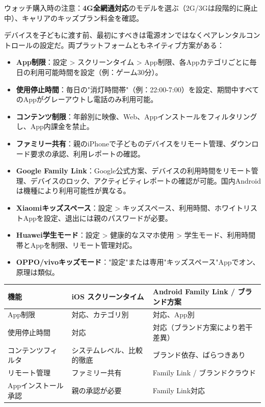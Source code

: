 ウォッチ購入時の注意：\textbf{4G全網通対応}のモデルを選ぶ（2G/3Gは段階的に廃止中）、キャリアのキッズプラン料金を確認。


デバイスを子どもに渡す前、最初にすべきは電源オンではなくペアレンタルコントロールの設定だ。両プラットフォームともネイティブ方案がある：


\begin{itemize}
  \item \textbf{App制限}：設定 > スクリーンタイム > App制限、各Appカテゴリごとに毎日の利用可能時間を設定（例：ゲーム30分）。
  \item \textbf{使用停止時間}：毎日の"消灯時間帯"（例：22:00-7:00）を設定、期間中すべてのAppがグレーアウトし電話のみ利用可能。
  \item \textbf{コンテンツ制限}：年齢別に映像、Web、Appインストールをフィルタリングし、App内課金を禁止。
  \item \textbf{ファミリー共有}：親のiPhoneで子どものデバイスをリモート管理、ダウンロード要求の承認、利用レポートの確認。
\end{itemize}


\begin{itemize}
  \item \textbf{Google Family Link}：Google公式方案、デバイスの利用時間をリモート管理、デバイスのロック、アクティビティレポートの確認が可能。国内Androidは機種により利用可能性が異なる。
  \item \textbf{Xiaomiキッズスペース}：設定 > キッズスペース、利用時間、ホワイトリストAppを設定、退出には親のパスワードが必要。
  \item \textbf{Huawei学生モード}：設定 > 健康的なスマホ使用 > 学生モード、利用時間帯とAppを制限、リモート管理対応。
  \item \textbf{OPPO/vivoキッズモード}："設定"または専用"キッズスペース"Appでオン、原理は類似。
\end{itemize}

\begin{center}
\begin{tabularx}{\linewidth}{|X|X|X|}
\hline
\textbf{機能} & \textbf{iOS スクリーンタイム} & \textbf{Android Family Link / ブランド方案} \tabularnewline
\hline
App制限 & 対応、カテゴリ別 & 対応、App別 \tabularnewline
使用停止時間 & 対応 & 対応（ブランド方案により若干差異） \tabularnewline
コンテンツフィルタ & システムレベル、比較的徹底 & ブランド依存、ばらつきあり \tabularnewline
リモート管理 & ファミリー共有 & Family Link / ブランドクラウド \tabularnewline
Appインストール承認 & 親の承認が必要 & Family Link対応 \tabularnewline
\hline
\end{tabularx}
\end{center}

